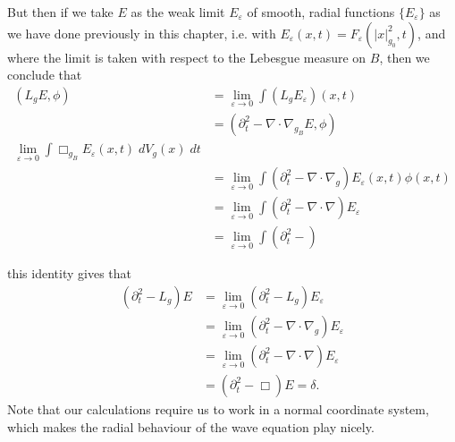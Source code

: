 But then if we take $E$ as the weak limit $E_\varepsilon$ of smooth, radial functions $\{ E_\varepsilon \}$ as we have done previously in this chapter, i.e. with $E_\varepsilon(x,t) = F_\varepsilon(|x|^2_{g_0}, t)$, and where the limit is taken with respect to the Lebesgue measure on $B$, then we conclude that
%
\begin{align*}
    ( L_g E, \phi ) &= \lim_{\varepsilon \to 0} \int (L_g E_\varepsilon)(x,t) \\
    &= ( \partial_t^2 - \nabla \cdot \nabla_{g_B} E, \phi )\\
    \lim_{\varepsilon \to 0} \int \Box_{g_B} E_\varepsilon(x,t)\; dV_g(x)\; dt\\
    &= \lim_{\varepsilon \to 0} \int (\partial_t^2 - \nabla \cdot \nabla_g) E_\varepsilon(x,t) \phi(x,t)\\
    &= \lim_{\varepsilon \to 0} \int (\partial_t^2 - \nabla \cdot \nabla) E_\varepsilon\\
    &= \lim_{\varepsilon \to 0} \int (\partial_t^2 - )
\end{align*}

 this identity gives that
%
\begin{align*}
    (\partial_t^2 - L_g) E &= \lim_{\varepsilon \to 0} (\partial_t^2 - L_g) E_\varepsilon\\
    &= \lim_{\varepsilon \to 0} (\partial_t^2 - \nabla \cdot \nabla_g) E_\varepsilon\\
    &= \lim_{\varepsilon \to 0} (\partial_t^2 - \nabla \cdot \nabla) E_\varepsilon\\
    &= (\partial_t^2 - \Box) E = \delta.
\end{align*}
%
Note that our calculations require us to work in a normal coordinate system, which makes the radial behaviour of the wave equation play nicely.

\begin{comment}
\begin{lemma}
    If we are working in a normal coordinate system, then
    \[ \nabla_{g(0)} f = \nabla_g f. \]
\end{lemma}
\begin{proof}
    We calculate using the chain rule that
    \begin{align*}
        \nabla_{g(0)} f &= G(0)^{-1} (\nabla_x f)\\
        &= 2 F'(|x|^2_{g(0)}) x
    \end{align*}
    and (now using the normal coordinate equation)
    \begin{align*}
        \nabla_g f(x) &= G(x)^{-1} (\nabla_x f)\\
        &= 2 F'(|x|^2_{g(0)}) [G(x)^{-1} G(0)] x\\
        &= 2 F'(|x|^2_{g(0)}) [G(x)^{-1} G(x)] x\\
        &= 2 F'(|x|^2_{g(0)}) x.
    \end{align*}
    Comparing calculations shows we have equality.
\end{proof}
\end{comment}

